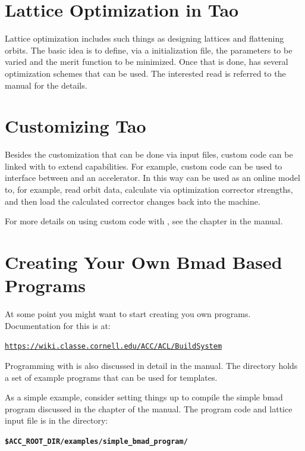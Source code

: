 \documentclass{hitec}
\newcommand{\BF}[1]{{\normalfont\textbf{#1}}}
\newcommand{\Section}[1]{\section{#1}\vspace*{-1ex}}
\newenvironment{display}
  {\vspace*{-1.5ex} \begin{alltt}}
  {\end{alltt} \vspace*{-1.0ex}}
\begin{document}
\section{Lattice Optimization in Tao}

Lattice optimization includes such things as designing lattices and flattening orbits.
The basic idea is to define, via a \tao initialization file, the parameters to be varied
and the merit function to be minimized. Once that is done, \tao has several optimization
schemes that can be used. The interested read is referred to the \tao manual for the
details.

\section{Customizing Tao}

Besides the customization that can be done via \tao input files, \tao custom code
can be linked with \tao to extend \tao capabilities. For example, custom code can
be used to interface between \tao and an accelerator. In this way \tao can be used
as an online model to, for example, read orbit data, calculate via optimization corrector
strengths, and then load the calculated corrector changes back into the machine.

For more details on using custom code with \tao, see the  chapter
in the \tao manual.

\Section{Creating Your Own Bmad Based Programs}

At some point you might want to start creating you own programs. Documentation for this is
at:
\begin{display}
  \url{https://wiki.classe.cornell.edu/ACC/ACL/BuildSystem}
\end{display}
Programming with \bmad is also discussed in detail in the \bmad manual. The  directory
holds a set of example programs that can be used for templates.

As a simple example, consider setting things up to compile the simple bmad program
discussed in the  chapter of the \bmad manual.
The program code and lattice input file is in the directory:
\begin{display}
  \BF{\$ACC_ROOT_DIR/examples/simple_bmad_program/}
\end{display}
\end{document}
